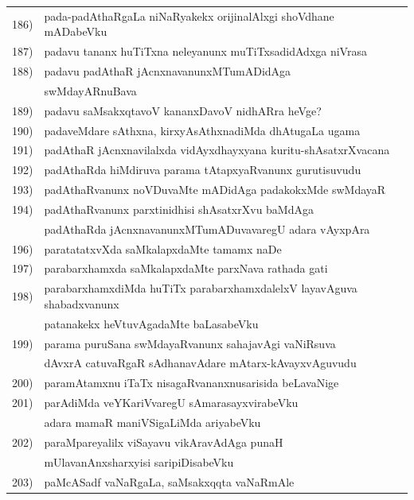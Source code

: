 \begin{longtable}{@{}cp{7.4cm}r}
186) & pada-padAthaRgaLa niNaRyakekx orijinalAlxgi shoVdhane mADabeVku & \pageref{page215}\\
187) & padavu tananx huTiTxna neleyanunx muTiTxsadidAdxga niVrasa & \pageref{page182}\\ 
188) & padavu padAthaR jAcnxnavanunxMTumADidAga & \\ 
        & swMdayARnuBava & \pageref{page200b}\\
189) & padavu saMsakxqtavoV kananxDavoV nidhARra heVge? &  \pageref{page7}\\
190) & padaveMdare sAthxna, kirxyAsAthxnadiMda dhAtugaLa ugama & \pageref{page1a}\\
191) & padAthaR jAcnxnavilalxda vidAyxdhayxyana kuritu-shAsatxrXvacana & \pageref{page39}\\
192) & padAthaRda hiMdiruva parama tAtapxyaRvanunx gurutisuvudu & \pageref{page240}\\
193) & padAthaRvanunx noVDuvaMte mADidAga padakokxMde swMdayaR & \pageref{page201}\\
194) & padAthaRvanunx parxtinidhisi shAsatxrXvu baMdAga  & \\
     & padAthaRda jAcnxnavanunxMTumADuvavaregU adara vAyxpAra & \pageref{page198}\\
196) & paratatatxvXda saMkalapxdaMte tamamx naDe &  \pageref{page253}\\
197) & parabarxhamxda saMkalapxdaMte parxNava rathada gati & \pageref{page77}\\
198) & parabarxhamxdiMda huTiTx parabarxhamxdalelxV layavAguva shabadxvanunx& \\ 
     & patanakekx heVtuvAgadaMte baLasabeVku  & \pageref{page192}\\
199) & parama puruSana swMdayaRvanunx sahajavAgi vaNiRsuva & \\
     & dAvxrA catuvaRgaR sAdhanavAdare mAtarx-kAvayxvAguvudu & \pageref{page193a}\\ 
200) & paramAtamxnu iTaTx nisagaRvananxnusarisida beLavaNige & \pageref{page77a}\\
201) & parAdiMda veYKariVvaregU sAmarasayxvirabeVku & \\
     & adara mamaR maniVSigaLiMda ariyabeVku & \pageref{page204}  \\
202) & paraMpareyalilx viSayavu vikAravAdAga punaH & \\
     & mUlavanAnxsharxyisi saripiDisabeVku & \pageref{page167}\\
203) & paMcASadf vaNaRgaLa, saMsakxqqta vaNaRmAle & \\

\end{longtable}
